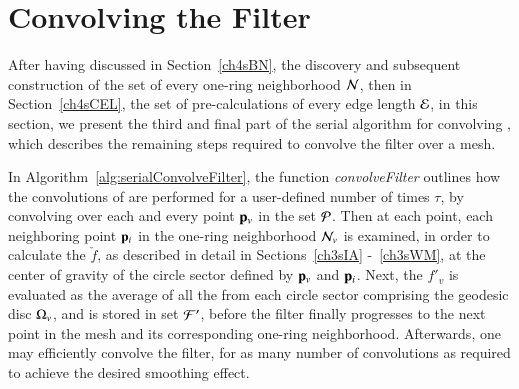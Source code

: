 %
%
%
%
\section{Convolving the Filter}
\label{ch4sCF}
After having discussed in Section~\ref{ch4sBN}, the discovery and subsequent construction of the set of every one-ring neighborhood $\mathcal{N}$, then in Section~\ref{ch4sCEL}, the set of pre-calculations of every edge length $\mathcal{E}$, in this section, we present the third and final part of the serial algorithm for convolving , which describes the remaining steps required to convolve the filter over a mesh.

In Algorithm~\ref{alg:serialConvolveFilter}, the function \textit{convolveFilter} outlines how the convolutions of  are performed for a user-defined number of times $\tau$, by convolving over each and every point $\mathbf{p}_v$ in the set $\mathcal{P}$. Then at each point, each neighboring point $\mathbf{p}_i$ in the one-ring neighborhood $\mathcal{N}_v$ is examined, in order to calculate the \wmfv{} $\check{f}$, as described in detail in Sections~\ref{ch3sIA} -~\ref{ch3sWM}, at the center of gravity of the circle sector defined by $\mathbf{p}_v$ and $\mathbf{p}_i$. Next, the \wmfv{} $f'_v$ is evaluated as the average of all the  from each circle sector comprising the geodesic disc $\Omega_v$, and is stored  in set $\mathcal{F}'$, before the filter finally progresses to the next point in the mesh and its corresponding one-ring neighborhood.  Afterwards, one may efficiently convolve the filter, for as many number of convolutions as required to achieve the desired smoothing effect.

